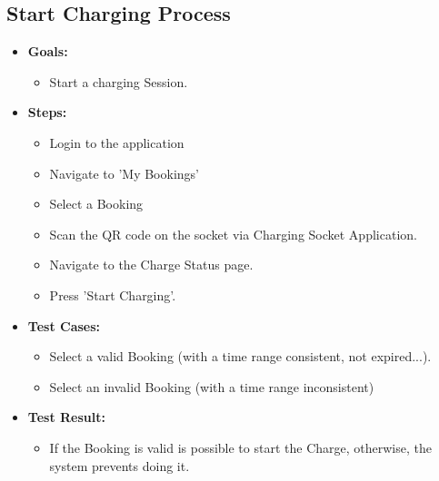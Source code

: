 \documentclass{Configuration_Files/PoliMi3i_thesis}
\begin{document}
\subsection{Start Charging Process}
\begin{itemize}
    \item\textbf{Goals:}
        \begin{itemize}
            \item Start a charging Session. 
       \end{itemize}
    \item \textbf{Steps:}
        \begin{itemize}
            \item Login to the application  
            \item Navigate to 'My Bookings'
             \item Select a Booking  
            \item Scan the QR code on the socket via Charging Socket Application.
            \item Navigate to the Charge Status page. 
            \item Press 'Start Charging'. 
        \end{itemize}         
    \item \textbf{Test Cases:}
        \begin{itemize}
            \item Select a valid Booking (with a time range consistent, not expired...).  
            \item Select an invalid Booking (with a time range inconsistent)
        \end{itemize}
    \item\textbf{Test Result:}
        \begin{itemize}
            \item If the Booking is valid is possible to start the Charge, otherwise, the system prevents doing it.
    \end{itemize}
\end{itemize}
\end{document}
